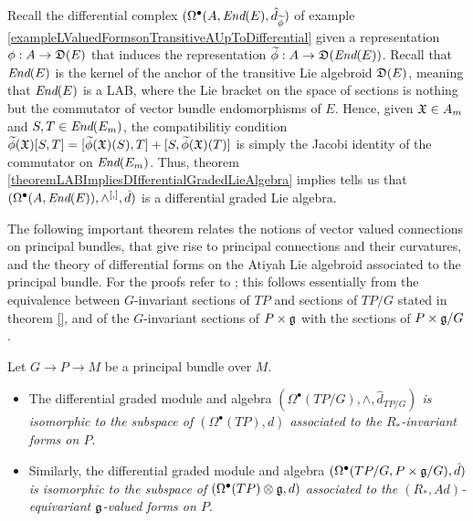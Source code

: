 \begin{example}\label{exampleOmegaAEndEIsDifferentialGradedLieAlgebra}
Recall the differential complex $(\Omega^\bullet(A, \End(E), \hat d_{\tilde \phi})$ of example \ref{exampleLValuedFormsonTransitiveAUpToDifferential} given a representation $\phi: A \to \alg D(E)$ that induces the representation $\tilde \phi:A \to \alg D(\End(E))$. Recall that $\operatorname{\textit{End}}(E)$ is the kernel of the anchor of the transitive Lie algebroid $\mathfrak{D}(E)$, meaning that $\operatorname{\textit{End}}(E)$ is a LAB, where the Lie bracket on the space of sections is nothing but the commutator of vector bundle endomorphisms of $E$. Hence, given $\mathfrak{X} \in A_m$ and $S, T \in \operatorname{\textit{End}}(E_m)$, the compatibilitiy condition $\tilde \phi(\oid X)[S, T] = [\tilde \phi(\oid X)(S), T] + [S, \tilde \phi(\oid X)(T)]$ is simply the Jacobi identity of the commutator on $\operatorname{\textit{End}}(E_m)$. Thus, theorem \ref{theoremLABImpliesDIfferentialGradedLieAlgebra} implies tells us that $(\Omega^\bullet(A, \operatorname{\textit{End}}(E)), \wedge^{[,]}, \hat d)$ is a differential graded Lie algebra.
\end{example}

\linea

The following important theorem relates the notions of vector valued connections on principal bundles, that give rise to principal connections and their curvatures, and the theory of differential forms on the Atiyah Lie algebroid associated to the principal bundle. For the proofs refer to \cite{Mackenzie2005}; this follows essentially from the equivalence between $G$-invariant sections of $TP$ and sections of $TP/G$ stated in theorem \ref{}, and of the $G$-invariant sections of $P \times \mathfrak{g}$ with the sections of $P \times \mathfrak{g}/G$.

\begin{theorem}\label{theoFormsPrincipalAtiyahSameGInvariantEquivariantSubspaces}
Let $G \to P \to M$ be a principal bundle over $M$. 
\begin{itemize}
    \item The differential graded module and algebra \textit{$(\Omega^\bullet(TP/G), \wedge, \hat d_{TP/G})$ is isomorphic to the subspace of $(\Omega^\bullet(TP), d)$ associated to the $R_*$-invariant  forms on $P$}.
    
    \item Similarly, the differential graded module and algebra \textit{$(\Omega^\bullet(TP/G, P \times \mathfrak{g}/G), \hat d)$ is isomorphic to the subspace of $(\Omega^\bullet(TP) \otimes \mathfrak{g}, d)$ associated to the $(R_*, Ad)$-equivariant $\mathfrak{g}$-valued forms on $P$}.
\end{itemize} 
\end{theorem}


